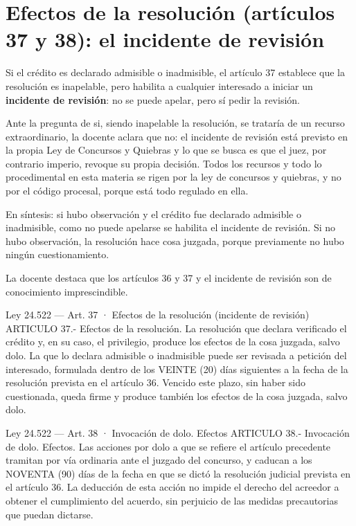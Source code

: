 \documentclass[12pt,oneside]{book}
\begin{document}
\section{Efectos de la resolución (artículos 37 y 38): el incidente de revisión}

Si el crédito es declarado admisible o inadmisible, el artículo 37 establece que la resolución es inapelable, pero habilita a cualquier interesado a iniciar un \textbf{incidente de revisión}: no se puede apelar, pero sí pedir la revisión.

Ante la pregunta de si, siendo inapelable la resolución, se trataría de un recurso extraordinario, la docente aclara que no: el incidente de revisión está previsto en la propia Ley de Concursos y Quiebras y lo que se busca es que el juez, por contrario imperio, revoque su propia decisión. Todos los recursos y todo lo procedimental en esta materia se rigen por la ley de concursos y quiebras, y no por el código procesal, porque está todo regulado en ella.

En síntesis: si hubo observación y el crédito fue declarado admisible o inadmisible, como no puede apelarse se habilita el incidente de revisión. Si no hubo observación, la resolución hace cosa juzgada, porque previamente no hubo ningún cuestionamiento.

\begin{note}
La docente destaca que los artículos 36 y 37 y el incidente de revisión son de conocimiento imprescindible.
\end{note}

\begin{legal}{Ley 24.522 — Art. 37 · Efectos de la resolución (incidente de revisión)}
ARTICULO 37.- Efectos de la resolución. La resolución que declara verificado el crédito y, en su caso, el privilegio, produce los efectos de la cosa juzgada, salvo dolo. La que lo declara admisible o inadmisible puede ser revisada a petición del interesado, formulada dentro de los VEINTE (20) días siguientes a la fecha de la resolución prevista en el artículo 36. Vencido este plazo, sin haber sido cuestionada, queda firme y produce también los efectos de la cosa juzgada, salvo dolo.
\end{legal}

\begin{legal}{Ley 24.522 — Art. 38 · Invocación de dolo. Efectos}
ARTICULO 38.- Invocación de dolo. Efectos. Las acciones por dolo a que se refiere el artículo precedente tramitan por vía ordinaria ante el juzgado del concurso, y caducan a los NOVENTA (90) días de la fecha en que se dictó la resolución judicial prevista en el artículo 36. La deducción de esta acción no impide el derecho del acreedor a obtener el cumplimiento del acuerdo, sin perjuicio de las medidas precautorias que puedan dictarse.
\end{legal}
\end{document}
